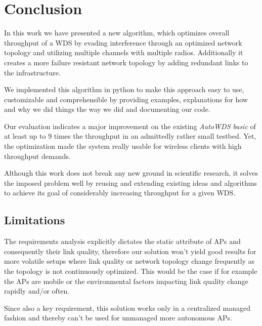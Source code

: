 \chapter{Conclusion}
  In this work we have presented a new algorithm, which optimizes overall throughput of a \ac{WDS} by evading interference through an optimized network topology 
  and utilizing multiple channels with multiple radios.
  Additionally it creates a more failure resistant network topology by adding redundant links to the infrastructure.
  
  We implemented this algorithm in python to make this approach easy to use, customizable and comprehensible by providing examples, 
  explanations for how and why we did things the way we did and documenting our code.
  
  Our evaluation indicates a major improvement on the existing \textit{AutoWDS basic} of at least up to 9 times the throughput in an admittedly rather small testbed.
  Yet, the optimization made the system really usable for wireless clients with high throughput demands.
  
  Although this work does not break any new ground in scientific research,
  it solves the imposed problem well by reusing and extending existing ideas and algorithms to achieve its goal of considerably increasing throughput for a given \ac{WDS}.
  
  \section{Limitations}
    The requirements analysis explicitly dictates the static attribute of APs and consequently their link quality, therefore our solution won't yield good 
    results for more volatile setups where link quality or network topology change frequently as the topology is not continuously optimized. 
    This would be the case if for example the APs are mobile or the environmental factors impacting link quality change rapidly and/or often.
    
    Since also a key requirement, this solution works only in a centralized managed fashion and thereby can't be used for unmanaged more autonomous APs.
    

